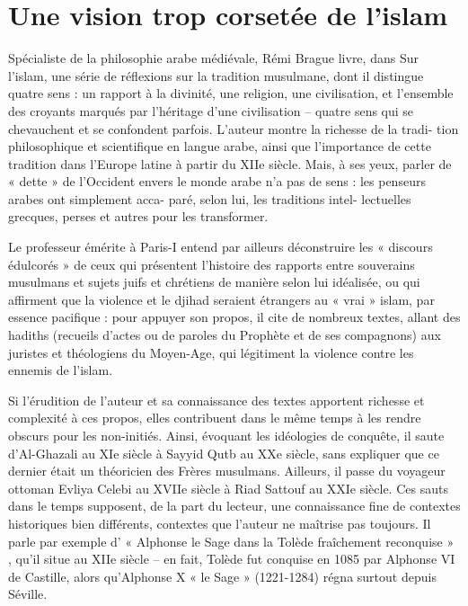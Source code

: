  
  \section{  Une vision trop corsetée de l’islam}



Spécialiste de la philosophie arabe médiévale, Rémi Brague livre, dans Sur l’islam, une
série de réflexions sur la tradition musulmane, dont il distingue quatre sens : un rapport à la divinité, une religion, une civilisation, et l’ensemble des croyants marqués par l’héritage d’une civilisation – quatre sens qui se chevauchent et se confondent parfois. L’auteur montre la richesse de la tradi- tion philosophique et scientifique en langue arabe, ainsi que l’importance de cette tradition dans l’Europe latine à partir du XIIe siècle. Mais, à ses yeux, parler de « dette » de l’Occident envers le monde arabe n’a pas de sens : les penseurs arabes ont simplement acca- paré, selon lui, les traditions intel- lectuelles grecques, perses et autres pour les transformer.

Le professeur émérite à Paris-I entend par ailleurs déconstruire les « discours édulcorés » de ceux qui présentent l’histoire des rapports entre souverains musulmans et sujets juifs et chrétiens de manière selon lui idéalisée, ou qui affirment que la violence et le djihad seraient étrangers au « vrai » islam, par essence pacifique : pour appuyer son propos, il cite de nombreux textes, allant des hadiths (recueils d’actes ou de paroles du Prophète et de ses compagnons) aux juristes et théologiens du Moyen-Age, qui légitiment la violence contre les ennemis de l’islam.

Si l’érudition de l’auteur et sa connaissance des textes apportent richesse et complexité à ces propos, elles contribuent dans le même temps à les rendre obscurs pour les non-initiés. Ainsi, évoquant les idéologies de conquête, il saute d’Al-Ghazali au XIe siècle à Sayyid Qutb au XXe siècle, sans expliquer que ce dernier était un théoricien des Frères musulmans. Ailleurs, il passe du voyageur ottoman Evliya Celebi au XVIIe siècle à Riad Sattouf au XXIe siècle. Ces sauts dans le temps supposent, de la part du lecteur, une connaissance fine de contextes historiques bien différents, contextes que l’auteur ne maîtrise pas toujours. Il parle par exemple d’ « Alphonse le Sage dans la Tolède fraîchement reconquise » , qu’il situe au XIIe siècle – en fait, Tolède fut conquise en 1085 par Alphonse VI de Castille, alors qu’Alphonse X « le Sage
» (1221-1284) régna surtout depuis Séville.
 
